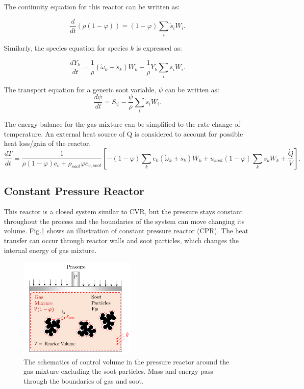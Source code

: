 The continuity equation for this reactor can be written as:

\begin{equation}
	\frac{d}{dt}(\rho(1-\varphi)) =(1-\varphi) \sum_i \dot s_i W_i
	\label{eqn:contconstuv}.
\end{equation} 

Similarly, the species equation for species $k$ is expressed as:

\begin{equation}
	\frac{dY_k}{dt}
	=
	\frac{1}{\rho}
	\left(
		{\dot{\omega}}_k
		+
		{\dot{s}}_k
	\right)W_k
	-\frac{1}{\rho}Y_k\sum_{i}{{\dot{s}}_i W_i}
	\label{eqn:speciesconstuv}.
\end{equation}

The transport equation for a generic soot variable, $\psi$ can be written as:
\begin{equation}
	\frac{d \psi}{d t}= S_{\psi} - \frac{\psi}{\rho} \sum_i \dot{s}_i W_i
	\label{eqn:sootconstuv}.
\end{equation}

The energy balance for the gas mixture can be simplified to the rate change of temperature. An external heat source of $\mathrm{\dot{Q}}$ is considered to account for possible heat loss/gain of the reactor.
\begin{equation}
	\frac{d T}{d t}=
	\frac{1}{\rho (1-\varphi) c_v+\rho_{soot}\varphi c_{v,soot}}
	\left[
		-(1-\varphi)\sum_k e_k
			\left(
				\dot{\omega}_k+\dot{s}_k
			\right) W_k
		+u_{soot}(1-\varphi)\sum_k \dot{s}_k W_k
		+\frac{\dot{Q}}{V}
	\right]
	\label{eqn:energyconstuv}.
\end{equation}

\subsection{Constant Pressure Reactor}

This reactor is a closed system similar to CVR, but the pressure stays constant throughout the process and the boundaries of the system can move changing its volume. Fig.\ref{fig:pressurecv} shows an illustration of constant pressure reactor (CPR). The heat transfer can occur through reactor walls and soot particles, which changes the internal energy of gas mixture.

\begin{figure}[!htbp]
	\centering
	\includegraphics[height=50mm, ]{Figures/Theory/Pressure.pdf}
	\caption{The schematics of control volume in the pressure reactor around the gas mixture excluding the soot particles. Mass and energy pass through the boundaries of gas and soot.}
	\label{fig:pressurecv}
\end{figure}


